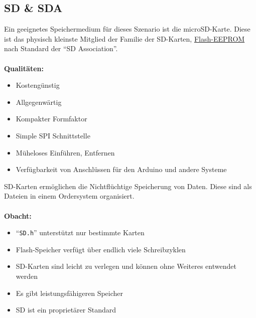 \documentclass[ngerman]{schoolPres}
\begin{document}
  \subsection{SD \& SDA}%
  \begin{frame}
    Ein geeignetes Speichermedium für dieses Szenario ist die microSD-Karte.
    Diese ist das physisch kleinste Mitglied der Familie der SD-Karten, \href{https://de.wikipedia.org/wiki/Flash-Speicher}{Flash-EEPROM} nach Standard der \enquote{SD Association}.\\~\\

    \textbf{Qualitäten:}
    \begin{itemize}
      \item Kostengünstig
      \item Allgegenwärtig
      \item Kompakter Formfaktor
      \item Simple SPI Schnittstelle
      \item Müheloses Einführen, Entfernen
      \item Verfügbarkeit von Anschlüssen für den Arduino und andere Systeme
    \end{itemize}


  \end{frame}

  \begin{frame}
    SD-Karten ermöglichen die Nichtflüchtige Speicherung von Daten.
    Diese sind als Dateien in einem Ordersystem organisiert.\\~\\

    \textbf{Obacht:}
    \begin{itemize}
      \item \enquote{\texttt{SD.h}} unterstützt nur bestimmte Karten\cite{sd-lib}
      \item Flash-Speicher verfügt über endlich viele Schreibzyklen\cite{zhang2017flash,sd-lifespan}
      \item SD-Karten sind leicht zu verlegen und können ohne Weiteres entwendet werden
      \item Es gibt leistungsfähigeren Speicher
      \item SD ist ein proprietärer Standard\cite{sd-proprietary}
    \end{itemize}

  \end{frame}
\end{document}
